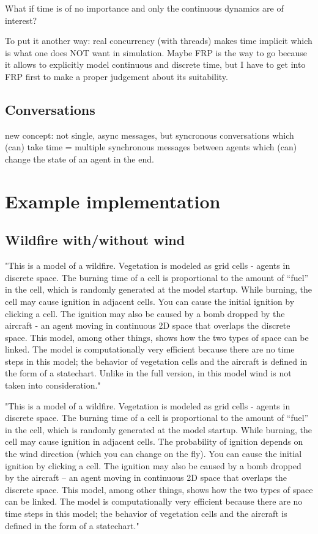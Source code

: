 What if time is of no importance and only the continuous dynamics are of interest?

To put it another way: real concurrency (with threads) makes time implicit which is what one does NOT want in simulation. Maybe FRP is the way to go because it allows to explicitly model continuous and discrete time, but I have to get into FRP first to make a proper judgement about its suitability.

\subsection{Conversations}
new concept: not single, async messages, but syncronous conversations which (can) take time = multiple synchronous messages between agents which (can) change the state of an agent in the end.

\section{Example implementation}

\subsection{Wildfire with/without wind}
"This is a model of a wildfire. Vegetation is modeled as grid cells - agents in discrete space. The burning time of a cell is proportional to the amount of “fuel” in the cell, which is randomly generated at the model startup. While burning, the cell may cause ignition in adjacent cells. You can cause the initial ignition by clicking a cell. The ignition may also be caused by a bomb dropped by the aircraft - an agent moving in continuous 2D space that overlaps the discrete space. This model, among other things, shows how the two types of space can be linked. The model is computationally very efficient because there are no time steps in this model; the behavior of vegetation cells and the aircraft is defined in the form of a statechart. Unlike in the full version, in this model wind is not taken into consideration."

"This is a model of a wildfire. Vegetation is modeled as grid cells - agents in discrete space. The burning time of a cell is proportional to the amount of “fuel” in the cell, which is randomly generated at the model startup. While burning, the cell may cause ignition in adjacent cells. The probability of ignition depends on the wind direction (which you can change on the fly). You can cause the initial ignition by clicking a cell. The ignition may also be caused by a bomb dropped by the aircraft – an agent moving in continuous 2D space that overlaps the discrete space. This model, among other things, shows how the two types of space can be linked. The model is computationally very efficient because there are no time steps in this model; the behavior of vegetation cells and the aircraft is defined in the form of a statechart."

